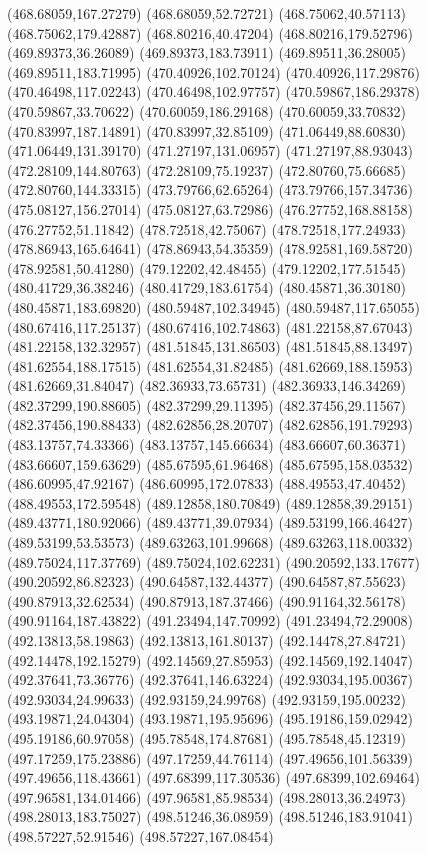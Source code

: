 {(468.68059,167.27279) (468.68059,52.72721) (468.75062,40.57113) (468.75062,179.42887) (468.80216,40.47204) (468.80216,179.52796) (469.89373,36.26089) (469.89373,183.73911)
(469.89511,36.28005) (469.89511,183.71995) (470.40926,102.70124) (470.40926,117.29876) (470.46498,117.02243) (470.46498,102.97757) (470.59867,186.29378) (470.59867,33.70622)
(470.60059,186.29168) (470.60059,33.70832) (470.83997,187.14891) (470.83997,32.85109) (471.06449,88.60830) (471.06449,131.39170) (471.27197,131.06957) (471.27197,88.93043)
(472.28109,144.80763) (472.28109,75.19237) (472.80760,75.66685) (472.80760,144.33315) (473.79766,62.65264) (473.79766,157.34736) (475.08127,156.27014) (475.08127,63.72986)
(476.27752,168.88158) (476.27752,51.11842) (478.72518,42.75067) (478.72518,177.24933) (478.86943,165.64641) (478.86943,54.35359) (478.92581,169.58720) (478.92581,50.41280)
(479.12202,42.48455) (479.12202,177.51545) (480.41729,36.38246) (480.41729,183.61754) (480.45871,36.30180) (480.45871,183.69820) (480.59487,102.34945) (480.59487,117.65055)
(480.67416,117.25137) (480.67416,102.74863) (481.22158,87.67043) (481.22158,132.32957) (481.51845,131.86503) (481.51845,88.13497) (481.62554,188.17515) (481.62554,31.82485)
(481.62669,188.15953) (481.62669,31.84047) (482.36933,73.65731) (482.36933,146.34269) (482.37299,190.88605) (482.37299,29.11395) (482.37456,29.11567) (482.37456,190.88433)
(482.62856,28.20707) (482.62856,191.79293) (483.13757,74.33366) (483.13757,145.66634) (483.66607,60.36371) (483.66607,159.63629) (485.67595,61.96468) (485.67595,158.03532)
(486.60995,47.92167) (486.60995,172.07833) (488.49553,47.40452) (488.49553,172.59548) (489.12858,180.70849) (489.12858,39.29151) (489.43771,180.92066) (489.43771,39.07934)
(489.53199,166.46427) (489.53199,53.53573) (489.63263,101.99668) (489.63263,118.00332) (489.75024,117.37769) (489.75024,102.62231) (490.20592,133.17677) (490.20592,86.82323)
(490.64587,132.44377) (490.64587,87.55623) (490.87913,32.62534) (490.87913,187.37466) (490.91164,32.56178) (490.91164,187.43822) (491.23494,147.70992) (491.23494,72.29008)
(492.13813,58.19863) (492.13813,161.80137) (492.14478,27.84721) (492.14478,192.15279) (492.14569,27.85953) (492.14569,192.14047) (492.37641,73.36776) (492.37641,146.63224)
(492.93034,195.00367) (492.93034,24.99633) (492.93159,24.99768) (492.93159,195.00232) (493.19871,24.04304) (493.19871,195.95696) (495.19186,159.02942) (495.19186,60.97058)
(495.78548,174.87681) (495.78548,45.12319) (497.17259,175.23886) (497.17259,44.76114) (497.49656,101.56339) (497.49656,118.43661) (497.68399,117.30536) (497.68399,102.69464)
(497.96581,134.01466) (497.96581,85.98534) (498.28013,36.24973) (498.28013,183.75027) (498.51246,36.08959) (498.51246,183.91041) (498.57227,52.91546) (498.57227,167.08454)
}
